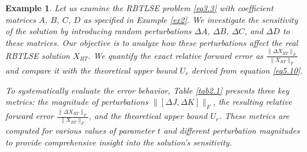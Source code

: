 \documentclass[preprint,11pt,3p]{elsarticle}
\newtheorem{example}[theorem]{Example}
\begin{document}
\begin{example}\label{ex2.1}
	Let us examine the RBTLSE problem \eqref{eq3.3} with coefficient matrices $A$, $B$, $C$, $D$ as specified in Example \ref{ex2}. We investigate the sensitivity of the solution by introducing random perturbations $\Delta A$, $\Delta B$, $\Delta C$, and $\Delta D$ to these matrices. Our objective is to analyze how these perturbations affect the real RBTLSE solution $X_{RT}$. We quantify the exact relative forward error as $\frac{\|\Delta X_{RT}\|_F}{\|X_{RT}\|_F}$ and compare it with the theoretical upper bound $U_r$ derived from equation \eqref{eq5.10}.
	
	To systematically evaluate the error behavior, Table \ref{tab2.1} presents three key metrics: the magnitude of perturbations $\|[\Delta J, \Delta K]\|_F$, the resulting relative forward error $\frac{\|\Delta X_{RT}\|_F}{\|X_{RT}\|_F}$, and the theoretical upper bound $U_r$. These metrics are computed for various values of parameter $t$ and different perturbation magnitudes to provide comprehensive insight into the solution's sensitivity.
\end{example}
\end{document}
